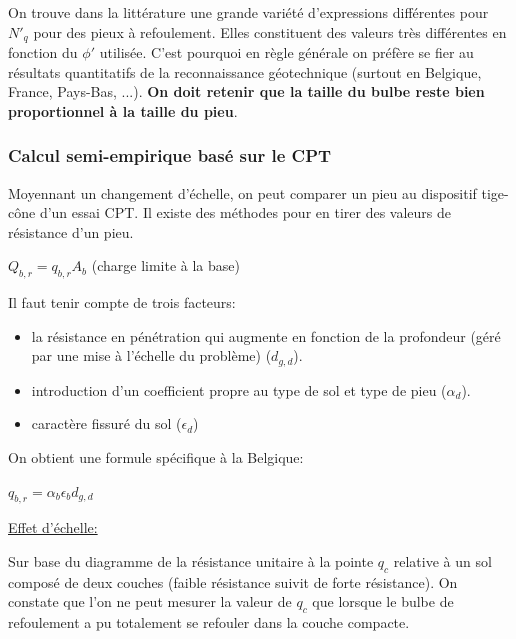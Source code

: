         On trouve dans la littérature une grande variété d'expressions différentes pour $N'_q$ pour des pieux à refoulement. Elles constituent des valeurs très différentes en fonction du $\phi'$ utilisée. C'est pourquoi en règle générale on préfère se fier au résultats quantitatifs de la reconnaissance géotechnique (surtout en Belgique, France, Pays-Bas, ...). \textbf{On doit retenir que la taille du bulbe reste bien proportionnel à la taille du pieu}.
        
        \subsubsection{Calcul semi-empirique basé sur le CPT}
        
        Moyennant un changement d'échelle, on peut comparer un pieu au dispositif tige-cône d'un essai CPT. Il existe des méthodes pour en tirer des valeurs de résistance d'un pieu.
        
        \begin{center}
            $Q_{b,r} = q_{b,r} A_b$ \: \: \: (charge limite à la base)
        \end{center} 
        
        Il faut tenir compte de trois facteurs:
        \begin{itemize}
            \item la résistance en pénétration qui augmente en fonction de la profondeur (géré par une mise à l'échelle du problème) ($d_{g,d}$).
            \item introduction d'un coefficient propre au type de sol et type de pieu ($\alpha_d$).
            \item caractère fissuré du sol ($\epsilon_d$)
        \end{itemize} 
        
        On obtient une formule spécifique à la Belgique:
        
        \begin{center}
            $q_{b,r} = \alpha_b \epsilon_b d_{g,d} $
        \end{center} 
        
        \underline{Effet d'échelle:} 
        
        Sur base du diagramme de la résistance unitaire à la pointe $q_c$ relative à un sol composé de deux couches (faible résistance suivit de forte résistance). On constate que l'on ne peut mesurer la valeur de $q_c$ que lorsque le bulbe de refoulement a pu totalement se refouler dans la couche compacte. 
        
